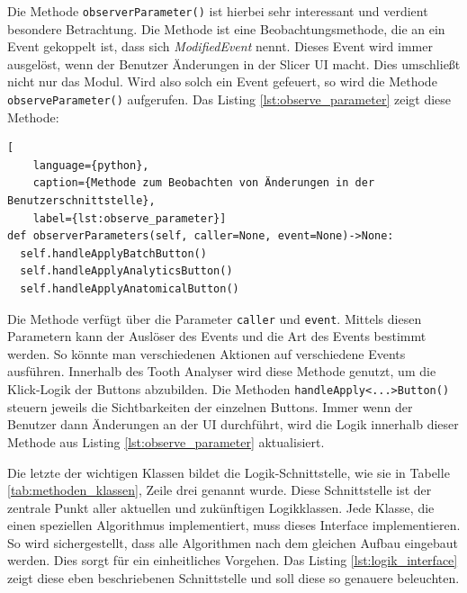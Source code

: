 Die Methode \texttt{observerParameter()} ist hierbei sehr interessant und
verdient besondere Betrachtung. Die Methode ist eine Beobachtungsmethode, die an
ein Event gekoppelt ist, dass sich \textit{ModifiedEvent} nennt. Dieses Event wird
immer ausgelöst, wenn der Benutzer Änderungen in der Slicer \ac{UI} macht. Dies
umschließt nicht nur das Modul. Wird also solch ein Event gefeuert, so wird die
Methode \texttt{observeParameter()} aufgerufen. Das Listing
\ref{lst:observe_parameter} zeigt diese Methode:

\begin{lstlisting}[
    language={python},
    caption={Methode zum Beobachten von Änderungen in der Benutzerschnittstelle},
    label={lst:observe_parameter}]
def observerParameters(self, caller=None, event=None)->None:
  self.handleApplyBatchButton()
  self.handleApplyAnalyticsButton()
  self.handleApplyAnatomicalButton()
\end{lstlisting}

Die Methode verfügt über die Parameter \texttt{caller} und \texttt{event}.
Mittels diesen Parametern kann der Auslöser des Events und die Art des Events
bestimmt werden. So könnte man verschiedenen Aktionen auf verschiedene Events ausführen.
Innerhalb des Tooth Analyser wird diese Methode genutzt, um die Klick-Logik der Buttons
abzubilden. Die Methoden \texttt{handleApply<...>Button()} steuern jeweils die Sichtbarkeiten
der einzelnen Buttons. Immer wenn der Benutzer dann Änderungen an der \ac{UI} durchführt,
wird die Logik innerhalb dieser Methode aus Listing \ref{lst:observe_parameter}
aktualisiert.

Die letzte der wichtigen Klassen bildet die Logik-Schnittstelle, wie sie in Tabelle
\ref{tab:methoden_klassen}, Zeile drei genannt wurde. Diese Schnittstelle ist der
zentrale Punkt aller aktuellen und zukünftigen Logikklassen. Jede Klasse, die einen
speziellen Algorithmus implementiert, muss dieses Interface implementieren. So wird
sichergestellt, dass alle Algorithmen nach dem gleichen Aufbau eingebaut werden.
Dies sorgt für ein einheitliches Vorgehen. Das Listing \ref{lst:logik_interface}
zeigt diese eben beschriebenen Schnittstelle und soll diese so genauere
beleuchten.

\pagebreak

